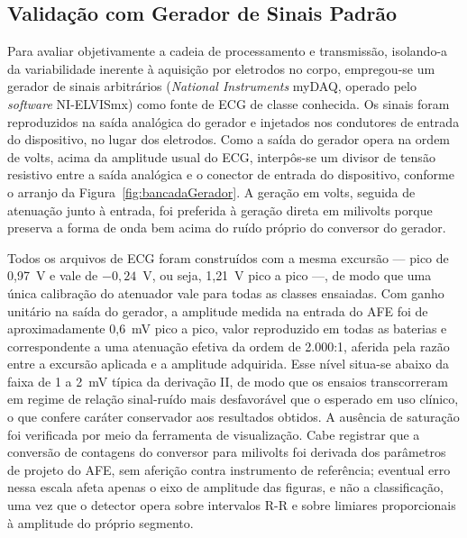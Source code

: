 \subsection{Validação com Gerador de Sinais Padrão}
\label{sec:validacaoGerador}

Para avaliar objetivamente a cadeia de processamento e transmissão, isolando-a da variabilidade inerente à aquisição por eletrodos no corpo, empregou-se um gerador de sinais arbitrários (\textit{National Instruments} myDAQ, operado pelo \textit{software} NI-ELVISmx) como fonte de \acs{ECG} de classe conhecida. Os sinais foram reproduzidos na saída analógica do gerador e injetados nos condutores de entrada do dispositivo, no lugar dos eletrodos. Como a saída do gerador opera na ordem de volts, acima da amplitude usual do \acs{ECG}, interpôs-se um divisor de tensão resistivo entre a saída analógica e o conector de entrada do dispositivo, conforme o arranjo da Figura~\ref{fig:bancadaGerador}. A geração em volts, seguida de atenuação junto à entrada, foi preferida à geração direta em milivolts porque preserva a forma de onda bem acima do ruído próprio do conversor do gerador.

Todos os arquivos de \acs{ECG} foram construídos com a mesma excursão --- pico de 0{,}97~V e vale de $-0{,}24$~V, ou seja, 1{,}21~V pico a pico ---, de modo que uma única calibração do atenuador vale para todas as classes ensaiadas. Com ganho unitário na saída do gerador, a amplitude medida na entrada do \acs{AFE} foi de aproximadamente 0{,}6~mV pico a pico, valor reproduzido em todas as baterias e correspondente a uma atenuação efetiva da ordem de 2.000:1, aferida pela razão entre a excursão aplicada e a amplitude adquirida. Esse nível situa-se abaixo da faixa de 1 a 2~mV típica da derivação II, de modo que os ensaios transcorreram em regime de relação sinal-ruído mais desfavorável que o esperado em uso clínico, o que confere caráter conservador aos resultados obtidos. A ausência de saturação foi verificada por meio da ferramenta de visualização. Cabe registrar que a conversão de contagens do conversor para milivolts foi derivada dos parâmetros de projeto do \acs{AFE}, sem aferição contra instrumento de referência; eventual erro nessa escala afeta apenas o eixo de amplitude das figuras, e não a classificação, uma vez que o detector opera sobre intervalos R-R e sobre limiares proporcionais à amplitude do próprio segmento.


